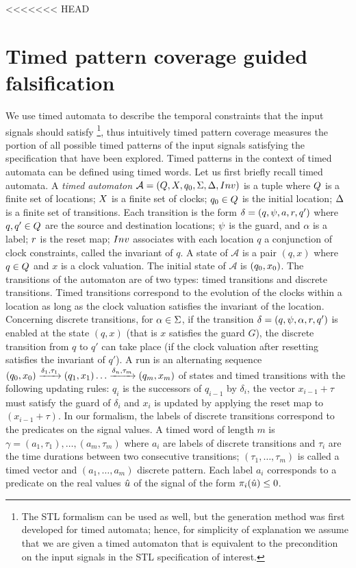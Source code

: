 <<<<<<< HEAD

\section{Timed pattern coverage guided falsification} \label{sec:specCov}
We use timed automata  to describe the temporal constraints that the input signals should satisfy \footnote{The STL formalism can be used as well, but the generation method was first developed for timed automata; hence, for simplicity of explanation we assume that we are given a timed automaton that is equivalent to the precondition on the input signals in the STL specification of interest.}, thus intuitively timed pattern coverage measures the portion of all possible timed patterns of the input signals satisfying the specification that have been explored. Timed patterns in the context of timed automata can be defined using timed words. Let us first briefly recall timed automata. A \emph{timed automaton} $\mathcal{A} = (Q, X, q_{0}, \Sigma, \Delta, Inv)$ is a tuple where $Q$ is a finite set of locations; $X$ is a finite set of clocks; $q_{0} \in Q$ is the initial location; $\Delta$ is a finite set of transitions. Each transition is the form $\delta = (q,\psi,a, r,q')$ where $q, q' \in Q$ are the source and destination locations; $\psi$ is the guard, and $\alpha$ is a label; $r$ is the reset map; $Inv$ associates with each location $q$ a conjunction of clock constraints, called the invariant of $q$. A state of $\mathcal{A}$ is a pair $(q,x)$ where $q \in Q$ and $x$ is a clock valuation. The initial state of $\mathcal{A}$ is $(q_{0}, x_0)$. The transitions of the automaton are of two types: timed transitions and discrete transitions. Timed transitions correspond to the evolution of the clocks within a location as long as the clock valuation satisfies the invariant of the location. Concerning discrete transitions, for $\alpha \in \Sigma$, if the transition $\delta = (q,\psi,\alpha,r,q')$ is enabled at the state $(q, x)$ (that is $x$ satisfies the guard $G$), the discrete transition from $q$ to $q'$ can take place (if the clock valuation after resetting satisfies the invariant of $q'$). A run is an alternating sequence $(q_{0},x_0)\xrightarrow{\delta_1,\tau_1}(q_1,x_1)\ldots \xrightarrow{\delta_n,\tau_m}(q_m,x_m)$ of states and timed transitions with the following updating rules: $q_{i}$ is the successors of $q_{i-1}$ by $\delta_i$, the vector $x_{i-1}+\tau$ must satisfy the guard of $\delta_i$ and $x_i$ is updated by applying the reset map to $(x_{i-1}+\tau)$. In our formalism, the labels of discrete transitions correspond to the predicates on the signal values. A timed word of length $m$ is $\gamma = (a_1, \tau_1), \ldots, (a_m, \tau_m)$ where $a_i$ are labels of discrete transitions and $\tau_i$ are the time durations between two consecutive transitions; $(\tau_1, \ldots, \tau_m)$ is called a timed vector and $(a_1, \ldots, a_m)$ discrete pattern. Each label $a_i$ corresponds to a predicate on the real values $\hat{u}$ of the signal of the form $\pi_i(\hat{u}) \le 0$. 

